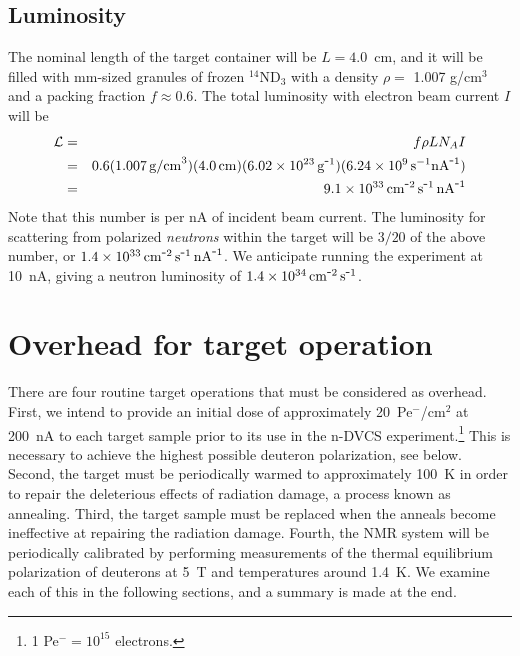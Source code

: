\documentclass[preprint,12pt]{elsarticle}
\begin{document}
\subsection{Luminosity}
The nominal length of the target container will be $L=4.0$~cm, and it will be filled with mm-sized granules of frozen $^{14}$ND$_3$ with a density $\rho =$ 1.007 g/cm$^3$ and a packing fraction $f\approx0.6$.  The total luminosity with electron beam current $I$ will be 
\begin{eqnarray}
	\mathcal{L}  & = & f \rho L N_A I   \\
& = & 0.6(1.007\, {\rm g/cm}^3)(4.0\,{\rm cm})(6.02\times10^{23}\,{\rm g}^{\minus 1})(6.24\times10^9\,{\rm s}^{-1}{\rm nA}^{\minus 1}) \nonumber \\
	                   & = & 9.1 \times 10^{33} \, {\rm cm}^{\minus 2} \,{\rm s}^{\minus 1} \,{\rm nA}^{\minus 1} \nonumber
\end{eqnarray}
Note that this number is per nA of incident beam current.  
The luminosity for scattering from polarized {\em neutrons\/} 
within the target will be $3/20$ of the above number, or 
$1.4 \times 10^{33}\,{\rm cm}^{\minus 2} \, {\rm s}^{\minus 1} \, {\rm nA}^{\minus 1}$.
We anticipate running the experiment at 10~nA, giving a neutron luminosity of $1.4\times10^{34} 
\,{\rm cm}^{\minus 2} \, {\rm s}^{\minus 1}$.



\section{Overhead for target operation}
There are four routine target operations that must be considered as overhead. 
First, we intend to provide an initial dose of approximately 20~Pe$^{\minus}$/cm$^2$ at 200~nA to each target sample prior to its use in the n-DVCS experiment.\footnote{1 Pe$^{\minus} = 10^{15}$ electrons.}  This is necessary to achieve the highest possible deuteron polarization, see below.  Second, the target must be periodically warmed to approximately 100~K in order to repair the deleterious effects of radiation damage, a process known as annealing.  Third, the target sample must be replaced when the anneals become ineffective at repairing the radiation damage.  Fourth, the NMR system will be periodically calibrated by performing
measurements of the thermal equilibrium polarization of deuterons at 5~T and temperatures around 1.4~K.
We examine each of this in the following sections, and a summary is made at the end.
\end{document}
